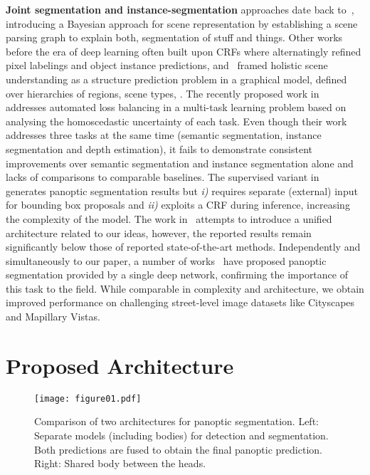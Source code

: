 \documentclass[10pt,twocolumn,letterpaper]{article}
\renewcommand{\paragraph}[1]{
        \vspace{3pt}
	\noindent\textbf{#1}}
\begin{document}
\paragraph{Joint segmentation and instance-segmentation} approaches date back to~\cite{Tu+05}, introducing a Bayesian approach for scene representation by establishing a scene parsing graph to explain both, segmentation of stuff and things. Other works before the era of deep learning often built upon CRFs where \cite{Tighe2014} alternatingly refined pixel labelings and object instance predictions, and~\cite{YaoFU12} framed holistic scene understanding as a structure prediction problem in a graphical model, defined over hierarchies of regions, scene types, \etc. The recently proposed work in~\cite{Kendall18} addresses automated loss balancing in a multi-task learning problem based on analysing the homoscedastic uncertainty of each task.  Even though their work addresses three tasks at the same time (semantic segmentation, instance segmentation and depth estimation), it fails to demonstrate consistent improvements over semantic segmentation and instance segmentation alone and lacks of comparisons to comparable baselines. The supervised variant in~\cite{Li2018Weaklypanoptic} generates panoptic segmentation results but \textit{i)} requires separate (external) input for bounding box proposals and \textit{ii)} exploits a CRF during inference, increasing the complexity of the model. The work in~\cite{Geus18} attempts to introduce a unified architecture related to our ideas, however, the reported results remain significantly below those of reported state-of-the-art methods. Independently and simultaneously to our paper, a number of works~\cite{Li2018,PanopticCOCOWinners2018,Xiong_UBER_2019,Kirillov19,Yang_Google_2019} have proposed panoptic segmentation provided by a single deep network, confirming the importance of this task to the field. While comparable in complexity and architecture, we obtain improved performance on challenging street-level image datasets like Cityscapes and Mapillary Vistas.

\section{Proposed Architecture}
\label{sec:method}

\begin{figure*}
	\centering
	\texttt{[image: figure01.pdf]}
	\caption{Comparison of two architectures for panoptic segmentation. 
Left: Separate models (including bodies) for detection and segmentation. Both predictions are fused to obtain the final panoptic prediction.
		Right: Shared body between the heads. } \label{fig:basic}
		\vspace{-10pt}
\end{figure*}
\end{document}
